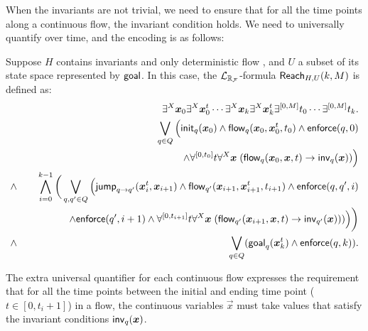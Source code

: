 When the invariants are not trivial, we need to ensure that for all the time points along a continuous flow, the invariant condition holds. We need to universally quantify over time, and the encoding is as follows:
\begin{definition}\label{br2}
Suppose $H$ contains invariants and only deterministic flow
, and $U$ a subset of its state space represented by $\mathsf{goal}$. In this case, the $\mathcal{L}_{\mathbb{R}_{\mathcal{F}}}$-formula $\mathsf{Reach}_{H,U}(k,M)$ is defined as:
\begin{eqnarray*}
& &\exists^X \vec x_{0} \exists^X\vec x_{0}^t\cdots \exists^X \vec x_{k}\exists^X\vec x_{k}^t \exists^{[0,M]}t_0\cdots \exists^{[0,M]}t_k.\\
& &\bigvee_{q\in Q} \Big(\init_{q}(\vec x_{0})\wedge \flow_{q}(\vec x_{0}, \vec x_{0}^t, t_0)\wedge \enforce(q,0)\\
& &\hspace{5cm} \wedge \forall^{[0,t_0]}t\forall^X\vec x\;(\flow_{q}(\vec x_{0}, \vec x, t)\rightarrow \inv_{q}(\vec x))\Big) \\
\wedge & &\bigwedge_{i=0}^{k-1}\bigg( \bigvee_{q, q'\in Q} \Big(\jump_{q\rightarrow q'}(\vec
x_{i}^t, \vec x_{i+1})\wedge \flow_{q'}(\vec x_{i+1}, \vec x_{i+1}^t, t_{i+1})\wedge \enforce(q,q',i)\\
& & \hspace{1.5cm}\wedge\enforce(q',i+1)\wedge \forall^{[0,t_{i+1}]}t\forall^X\vec x\;(\flow_{q'}(\vec x_{i+1}, \vec x,
t)\rightarrow \inv_{q'}(\vec x)) )\Big)\bigg)\\
\wedge & &\bigvee_{q\in Q} (\goal_q(\vec x_{k}^t)\wedge \enforce(q,k)).
\end{eqnarray*}
\end{definition}
The extra universal quantifier for each continuous flow expresses the requirement that for all the time points between the initial and ending time point ($t\in[0,t_i+1]$) in a flow, the continuous variables $\vec x$ must take values that satisfy the invariant conditions $\inv_q(\vec x)$.

